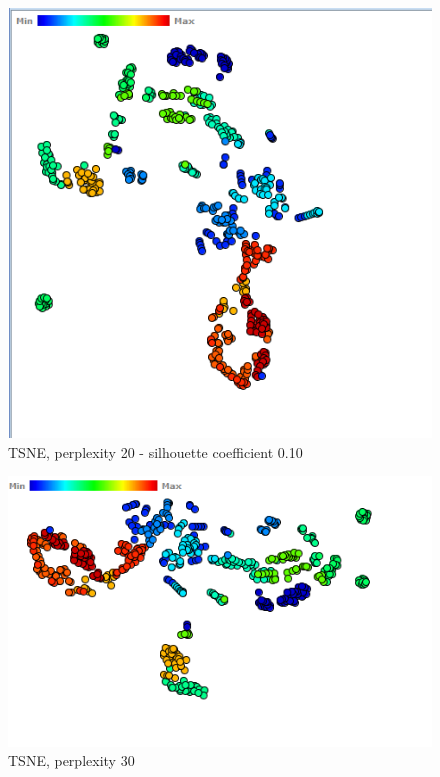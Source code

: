 \documentclass[ 10pt ]{fphw}
\begin{document}
\begin{center}
\begin{figure}[H]
    \centering
	\includegraphics[width=0.65\columnwidth]{task2d/medTSNE20.PNG}
	\caption{TSNE, perplexity 20 - silhouette coefficient 0.10}
	\label{fig:medt20}
	\end{figure}
\end{center}

\begin{center}
\begin{figure}[H]
    \centering
	\includegraphics[width=0.65\columnwidth]{task2d/medTSNE30.PNG}
	\caption{TSNE, perplexity 30}
	\label{fig:medt30}
	\end{figure}
\end{center}
\end{document}
